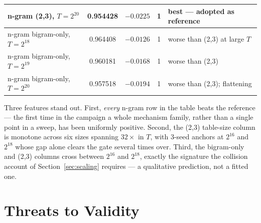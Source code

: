 \documentclass{article}
\begin{document}
\begin{table}[t]
\begin{center}
\begin{small}
\begin{tabular}{lcccl}
\textbf{n-gram (2,3), $T = 2^{20}$} & \textbf{0.954428} & $-0.0225$ & 1 & \textbf{best --- adopted as reference} \\
\midrule
n-gram bigram-only, $T = 2^{18}$ & 0.964408 & $-0.0126$ & 1 & worse than (2,3) at large $T$ \\
n-gram bigram-only, $T = 2^{19}$ & 0.960181 & $-0.0168$ & 1 & worse than (2,3) \\
n-gram bigram-only, $T = 2^{20}$ & 0.957518 & $-0.0194$ & 1 & worse than (2,3); flattening \\
\bottomrule
\end{tabular}
\end{small}
\end{center}
\vskip -0.1in
\end{table}

Three features stand out. First, \emph{every} n-gram row in the table beats the reference --- the first time in the campaign a whole mechanism family, rather than a single point in a sweep, has been uniformly positive. Second, the (2,3) table-size column is monotone across six sizes spanning $32\times$ in $T$, with 3-seed anchors at $2^{16}$ and $2^{18}$ whose gap alone clears the gate several times over. Third, the bigram-only and (2,3) columns cross between $2^{16}$ and $2^{18}$, exactly the signature the collision account of Section~\ref{sec:scaling} requires --- a qualitative prediction, not a fitted one.

\section{Threats to Validity}
\label{sec:threats}
\end{document}
